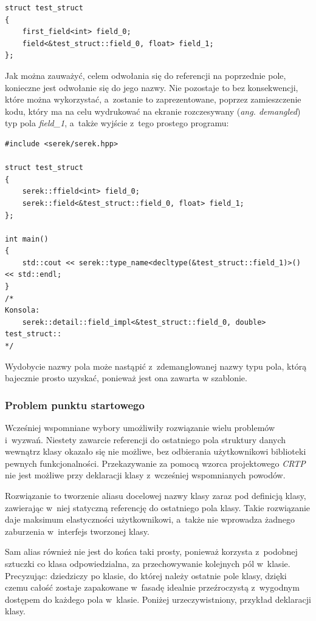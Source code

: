 \documentclass[12pt]{article}
\newcommand{\n}{\newline}
\newcommand{\nonpl}[1]{{\it #1}}
\newcommand{\code}[1]{{\it #1}}
\newcommand{\ang}[1]{\nonpl{ang. #1}}
\newcommand{\CRTP}{\nonpl{CRTP} }
\begin{document}
{{{				\begin{lstlisting}[frame=single]
struct test_struct
{
	first_field<int> field_0;
	field<&test_struct::field_0, float> field_1;
};
				\end{lstlisting}

				Jak można zauważyć, celem odwołania się do referencji na poprzednie pole, konieczne jest odwołanie się do jego nazwy. Nie pozostaje to bez
				konsekwencji, które można wykorzystać, a~zostanie to zaprezentowane, poprzez zamieszczenie kodu, który ma na celu wydrukować na ekranie
				rozczesywany (\ang{demangled}) typ pola \code{field\_1}, a~także wyjście z~tego prostego programu:\n

				\begin{lstlisting}[frame=single]
#include <serek/serek.hpp>

struct test_struct
{
	serek::ffield<int> field_0;
	serek::field<&test_struct::field_0, float> field_1;
};

int main()
{
	std::cout << serek::type_name<decltype(&test_struct::field_1)>() << std::endl;
}
/*
Konsola:
	serek::detail::field_impl<&test_struct::field_0, double> test_struct::
*/
				\end{lstlisting}

				Wydobycie nazwy pola może nastąpić z~zdemanglowanej nazwy typu pola, którą bajecznie prosto uzyskać, ponieważ jest ona zawarta
				w szablonie.
			}

			{
				\subsubsection{Problem punktu startowego}

				Wcześniej wspomniane wybory umożliwiły rozwiązanie wielu problemów i~wyzwań. Niestety zawarcie referencji do ostatniego pola
				struktury danych wewnątrz klasy okazało się nie możliwe, bez odbierania użytkownikowi biblioteki pewnych funkcjonalności.
				Przekazywanie za pomocą wzorca projektowego \CRTP nie jest możliwe przy deklaracji klasy z~wcześniej wspomnianych powodów.\n

				Rozwiązanie to tworzenie aliasu docelowej nazwy klasy zaraz pod definicją klasy, zawierając w~niej statyczną referencję do ostatniego pola klasy.
				Takie rozwiązanie daje maksimum elastyczności użytkownikowi, a~także nie wprowadza żadnego zaburzenia w~interfejs tworzonej klasy.\n

				Sam alias również nie jest do końca taki prosty, ponieważ korzysta z~podobnej sztuczki co klasa odpowiedzialna, za przechowywanie
				kolejnych pól w~klasie. Precyzując: dziedziczy po klasie, do której należy ostatnie pole klasy, dzięki czemu całość zostaje
				zapakowane w~fasadę idealnie przeźroczystą z~wygodnym dostępem do każdego pola w~klasie. Poniżej urzeczywistniony, przykład deklaracji klasy.\n

}}}
\end{document}
